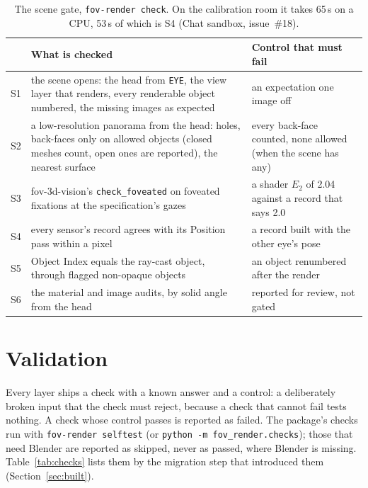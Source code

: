 \documentclass[11pt,a4paper]{article}
\newcommand{\code}[1]{\texttt{\small #1}}
\newcommand{\cell}{\raggedright\arraybackslash}
\begin{document}
\begin{table}[!htbp]
\centering\footnotesize
\begin{tabularx}{\textwidth}{@{}>{\cell}p{0.6cm} L >{\cell}p{5.0cm}@{}}
\toprule
& What is checked & Control that must fail \\
\midrule
S1 & the scene opens: the head from \code{EYE}, the view layer that renders, every renderable object numbered, the
  missing images as expected & an expectation one image off \\
S2 & a low-resolution panorama from the head: holes, back-faces only on allowed objects (closed meshes count, open
  ones are reported), the nearest surface & every back-face counted, none allowed (when the scene has any) \\
S3 & fov-3d-vision's \code{check\_foveated} on foveated fixations at the specification's gazes & a shader $E_2$ of
  2.04 against a record that says 2.0 \\
S4 & every sensor's record agrees with its Position pass within a pixel & a record built with the other eye's
  pose \\
S5 & Object Index equals the ray-cast object, through flagged non-opaque objects & an object renumbered after the
  render \\
S6 & the material and image audits, by solid angle from the head & reported for review, not gated \\
\bottomrule
\end{tabularx}
\caption{The scene gate, \code{fov-render check}. On the calibration room it takes 65\,s on a CPU, 53\,s of
which is S4 (Chat sandbox, issue~\#18).}\label{tab:scene}
\end{table}

\section{Validation}\label{sec:checks}

Every layer ships a check with a known answer and a control: a deliberately broken input that the check must
reject, because a check that cannot fail tests nothing. A check whose control passes is reported as failed. The
package's checks run with \code{fov-render selftest} (or \code{python -m fov\_render.checks}); those that need
Blender are reported as skipped, never as passed, where Blender is missing. Table~\ref{tab:checks} lists them by
the migration step that introduced them (Section~\ref{sec:built}).
\end{document}
